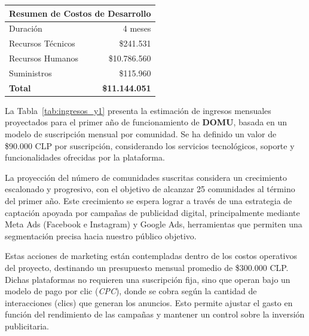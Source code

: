 {\begin{table}[H]
    \begin{tabular}{|l|r|}
    
    \hline
    \multicolumn{2}{|c|}{\textbf{Resumen de Costos de Desarrollo}}\\
    \hline
    
    Duración & 4 meses\\
    \hline
    Recursos Técnicos & \$241.531\\
    \hline
    Recursos Humanos & \$10.786.560\\
    \hline
    Suministros & \$115.960\\
    \hline
    \textbf{Total} & \textbf{\$11.144.051}\\
    \hline
    
    \end{tabular}
\end{table}


La Tabla~\ref{tab:ingresos_y1} presenta la estimación de ingresos mensuales proyectados para el primer año de funcionamiento de \textbf{DOMU}, basada en un modelo de suscripción mensual por comunidad. Se ha definido un valor de \$90.000 CLP por suscripción, considerando los servicios tecnológicos, soporte y funcionalidades ofrecidas por la plataforma.

La proyección del número de comunidades suscritas considera un crecimiento escalonado y progresivo, con el objetivo de alcanzar 25 comunidades al término del primer año. Este crecimiento se espera lograr a través de una estrategia de captación apoyada por campañas de publicidad digital, principalmente mediante Meta Ads (Facebook e Instagram) y Google Ads, herramientas que permiten una segmentación precisa hacia nuestro público objetivo.

Estas acciones de marketing están contempladas dentro de los costos operativos del proyecto, destinando un presupuesto mensual promedio de \$300.000 CLP. Dichas plataformas no requieren una suscripción fija, sino que operan bajo un modelo de pago por clic (\textit{CPC}), donde se cobra según la cantidad de interacciones (clics) que generan los anuncios.  Esto permite ajustar el gasto en función del rendimiento de las campañas y mantener un control sobre la inversión publicitaria.


\begin{table}[H]


\end{table}}
